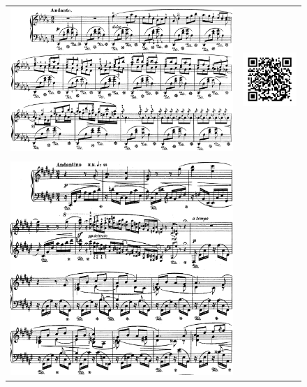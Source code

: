 \begin{figure}[!p]
  \begin{bigcenter}
    \begin{tabular}{lr}
      \vspace*{0.0cm}
      \includegraphics[width=12.5cm, keepaspectratio]{berceuse.png}
      &
      \includegraphics[width=3cm, keepaspectratio]{berceuse-qr.png}
      \\
      \vspace{0.5cm} &
      \\
      \includegraphics[width=12.5cm, keepaspectratio]{op11-i.png}

\end{tabular}
\end{bigcenter}
\end{figure}
